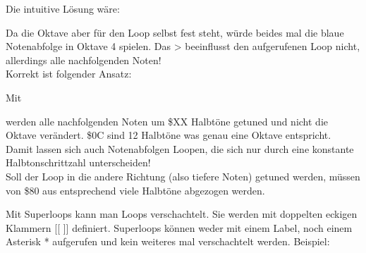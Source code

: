 \medskip



\medskip

Die intuitive Lösung wäre:

\medskip



\medskip

Da die Oktave aber für den Loop selbst fest steht, würde beides mal die blaue Notenabfolge in Oktave 4 spielen. Das > beeinflusst den aufgerufenen Loop nicht, allerdings alle nachfolgenden Noten! \\
Korrekt ist folgender Ansatz:

\medskip



\medskip

Mit

\medskip



\medskip

werden alle nachfolgenden Noten um \$XX Halbtöne getuned und nicht die Oktave verändert.
\$0C sind 12 Halbtöne was genau eine Oktave entspricht.
Damit lassen sich auch Notenabfolgen Loopen, die sich nur durch eine konstante Halbtonschrittzahl unterscheiden! \\
Soll der Loop in die andere Richtung (also tiefere Noten) getuned werden, müssen von \$80 aus entsprechend viele Halbtöne abgezogen werden.

\bigskip

Mit Superloops kann man Loops verschachtelt. Sie werden mit doppelten eckigen Klammern [[ ]] definiert. Superloops können weder mit einem Label, noch einem Asterisk \** aufgerufen und kein weiteres mal verschachtelt werden. Beispiel:

\medskip



\medskip


